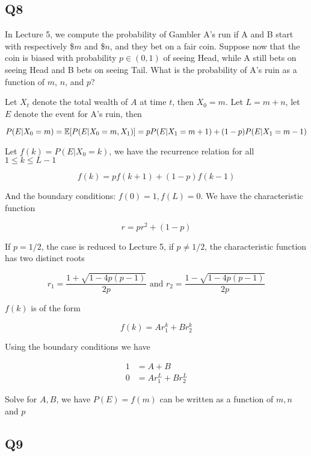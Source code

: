 \documentclass{article}
\begin{document}
\subsection{Q8}

In Lecture 5, we compute the probability of Gambler A's run if A and B start with respectively \$$m$ and \$$n$, and they bet on a fair coin. Suppose now that the coin is biased with probability $p \in (0, 1)$ of seeing Head, while A still bets on seeing Head and B bets on seeing Tail. What is the probability of A's ruin as a function of $m$, $n$, and $p$?

\begin{longproof}[Answer]

Let $X_t$ denote the total wealth of $A$ at time $t$, then $X_0 = m$. Let $L = m+n$, let $E$ denote the event for A's ruin, then

$$
    P(E | X_0 = m) = \mathbb{E}[P(E | X_0 = m, X_1)] = p P(E | X_1 = m+1) + (1-p) P(E | X_1 = m-1)
$$

Let $f(k) = P(E | X_0 = k)$, we have the recurrence relation for all $1 \leq k \leq L-1$

$$
    f(k) = p f(k+1) + (1-p) f(k-1)
$$

And the boundary conditions: $f(0) = 1, f(L) = 0$. We have the characteristic function

$$
    r = p r^2 + (1-p)
$$

If $p = 1/2$, the case is reduced to Lecture 5, if $p \neq 1/2$, the characteristic function has two distinct roots

$$
    r_1 = \frac{1 + \sqrt{1 - 4p(p-1)}}{2p} \text{ and } r_2 = \frac{1 - \sqrt{1 - 4p(p-1)}}{2p}
$$

$f(k)$ is of the form

$$
    f(k) = A r_1^k + B r_2^k
$$

Using the boundary conditions we have

\begin{align*}
    1 &= A + B \\
    0 &= A r_1^L + B r_2^L
\end{align*}

Solve for $A, B$, we have $P(E) = f(m)$ can be written as a function of $m, n$ and $p$
    
\end{longproof}

\subsection{Q9}
\end{document}
